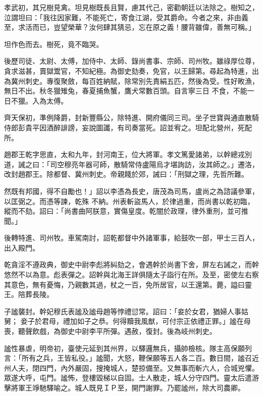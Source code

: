 \begin{pinyinscope}
 孝武初，其兄樹見禽。坦見樹既長且賢，慮其代己，密勸朝廷以法除之。樹知之，泣謂坦曰：「我往因家難，不能死亡，寄食江湖，受其爵命。今者之來，非由義至，求活而已，豈望榮華？汝何肆其猜忌，忘在原之義！腰背雖偉，善無可稱。」



 坦作色而去。樹死，竟不臨哭。



 後歷司徒、太尉、太傅，加侍中、太師、錄尚書事、宗師、司州牧。雖祿厚位尊，貪求滋甚，賣獄鬻官，不知紀極。為御史劾奏，免官，以王歸第。尋起為特進，出為冀州刺史。專復聚斂，每百姓納賦，除常別先責絹五匹，然後為受。性好畋漁，無日不出。秋冬獵雉兔，春夏捕魚蟹，鷹犬常數百頭。自言寧三日
 不食，不能一日不獵。入為太傅。



 齊天保初，準例降爵，封新豐縣公，除特進、開府儀同三司。坐子世寶與通直散騎侍郎彭貴平因酒醉誹謗，妄說圖讖，有司奏當死。詔並宥之。坦配北營州，死配所。



 趙郡王乾字思直，太和九年，封河南王，位大將軍。孝文篤愛諸弟，以幹總戎別道，誡之曰：「司空穆亮年器可師，散騎常侍盧陽烏才堪詢訪，汝其師之。」遷洛，改封趙郡王。除都督、冀州刺史。帝親餞於郊，誡曰：「刑獄之理，先哲所難。



 然既有邦國，得不自勵也！」詔以李憑為長史，唐茂為司馬，盧尚之為諮議參軍，以匡弼之。而憑等諫，乾殊
 不納。州表斬盜馬人，於律過重，而尚書以乾初臨，縱而不劾。詔曰：「尚書曲阿朕意，實傷皇度。乾闇於政理，律外重刑，並可推聞。」



 後轉特進、司州牧。車駕南討，詔乾都督中外諸軍事，給鼓吹一部，甲士三百人，出入殿門。



 乾貪淫不遵政典，御史中尉李彪將糾劾之，會遇幹於尚書下舍，屏左右誡之，而幹悠然不以為意。彪表彈之。詔幹與北海王詳俱隨太子詣行在所。及至，密使左右察其意色，無有憂悔，乃親數其過，杖之一百，免所居官，以王還第。薨，謚曰靈王。陪葬長陵。



 子謐襲封。幹妃穆氏表謐及謐母趙等悖禮愆常。詔曰：「妾於女君，猶婦人事姑舅；
 妾子於君母，禮加如子之恭。何得黷我風猷，可付宗正依禮正罪。」謐在母喪，聽聲飲戲，為御史中尉李平所彈。遇赦，復封。後為岐州刺史。



 謐性暴虐，明帝初，臺使元延到其州界，以驛邏無兵，攝帥檢核。隊主高保願列言：「所有之兵，王皆私役。」謐聞，大怒，鞭保願等五人各二百。數日間，謐召近州人夫，閉四門，內外嚴固，搜掩城人，楚掠備至。又無事而斬六人，合城兇懼。眾遂大呼，屯門。謐怖，登樓毀梯以自固。士人散走，城人分守四門。靈太后遣游擊將軍王竫馳驛喻之。城人既見ＩＰ至，開門謝罪。乃罷謐州，除大司農卿。




\end{pinyinscope}
